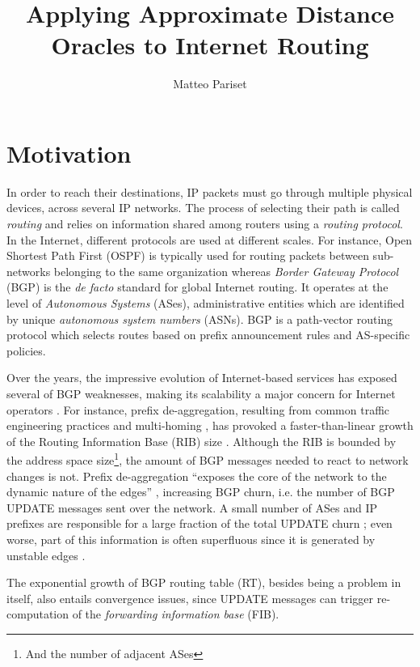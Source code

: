 \documentclass[a4paper,11pt,oneside]{report}
\title{Applying Approximate Distance Oracles to Internet Routing}
\author{Matteo Pariset}
\begin{document}
\maketitle


\chapter{Motivation}
In order to reach their destinations, IP packets must go through multiple physical devices, across several IP networks. The process of selecting their path is called \emph{routing} and relies on information shared among routers using a \emph{routing protocol}. In the Internet, different protocols are used at different scales. For instance, Open Shortest Path First (OSPF) is typically used for routing packets between sub-networks belonging to the same organization whereas \emph{Border Gateway Protocol} (BGP) is the \textit{de facto} standard for global Internet routing. It operates at the level of \emph{Autonomous Systems} (ASes), administrative entities which are identified by unique \emph{autonomous system numbers} (ASNs).
BGP is a path-vector routing protocol which selects routes based on prefix announcement rules and AS-specific policies.

\bigskip
Over the years, the impressive evolution of Internet-based services has exposed several of BGP weaknesses, making its scalability a major concern for Internet operators \cite{elmokashfiScalabilityBGPRole2010}. For instance, prefix de-aggregation, resulting from common traffic engineering practices and multi-homing \cite{dReportIABWorkshop}, has provoked a faster-than-linear growth of the Routing Information Base (RIB) size \cite{Potaroo}. Although the RIB is bounded by the address space size\footnote{And the number of adjacent ASes}, the amount of BGP messages needed to react to network changes is not. Prefix de-aggregation ``exposes the core of the network to the dynamic nature of the edges'' \cite{dReportIABWorkshop}, increasing BGP churn, i.e. the number of BGP UPDATE messages sent over the network. A small number of ASes and IP prefixes are responsible for a large fraction of the total UPDATE churn \cite{BGPchurnCore2012}; even worse, part of this information is often superfluous since it is generated by unstable edges \cite{Oliveira_measurementof}.

The exponential growth of BGP routing table (RT), besides being a problem in itself, also entails convergence issues, since UPDATE messages can trigger re-computation of the \emph{forwarding information base} (FIB).
\end{document}
